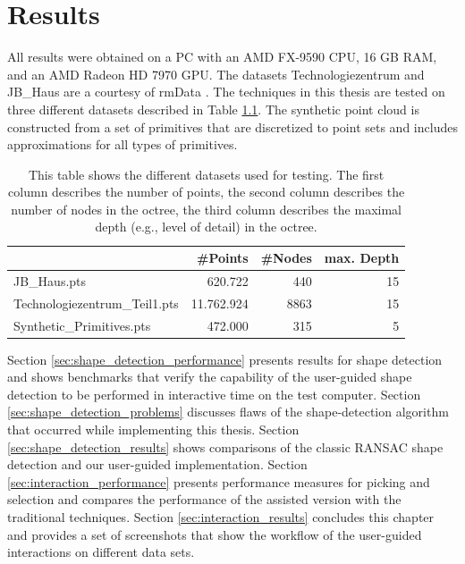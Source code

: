 \chapter{Results}
\label{chap:results}

All results were obtained on a PC with an AMD FX-9590 CPU, 16 GB RAM, and an AMD Radeon HD 7970 GPU. The datasets Technologiezentrum and JB\_Haus are a courtesy of rmData \cite{rmdata}. The techniques in this thesis are tested on three different datasets described in Table \ref{tab:datasets}. The synthetic point cloud is constructed from a set of primitives that are discretized to point sets and includes approximations for all types of primitives. 

\begin{table}
\centering
\begin{tabular}{ l | r | r | r }
                        & \textbf{\#Points} & \textbf{\#Nodes}    & \textbf{max. Depth} \\
    \hline
  JB\_Haus.pts                  & 620.722           & 440   & 15 \\
  Technologiezentrum\_Teil1.pts & 11.762.924        & 8863  & 15 \\
  Synthetic\_Primitives.pts     & 472.000           & 315   & 5 \\
\end{tabular}
\caption[Table of point-cloud datasets]
{This table shows the different datasets used for testing. The first column describes the number of points, the second column describes the number of nodes in the octree, the third column describes the maximal depth (e.g., level of detail) in the octree. } 
\label{tab:datasets}
\end{table}


Section \ref{sec:shape_detection_performance} presents results for shape detection and shows benchmarks that verify the capability of the user-guided shape detection to be performed in interactive time on the test computer.
Section \ref{sec:shape_detection_problems} discusses flaws of the shape-detection algorithm that occurred while implementing this thesis.
Section \ref{sec:shape_detection_results} shows comparisons of the classic RANSAC shape detection and our user-guided implementation. 
Section \ref{sec:interaction_performance} presents performance measures for picking and selection and compares the performance of the assisted version with the traditional techniques. 
Section \ref{sec:interaction_results} concludes this chapter and provides a set of screenshots that show the workflow of the user-guided interactions on different data sets. 


